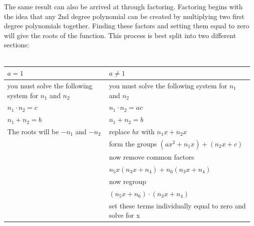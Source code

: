 \documentclass[../Math_Notes.tex]{subfiles}
\begin{document}
The same result can also be arrived at through factoring. Factoring begins with the idea that any 2nd degree polynomial can be created by multiplying two first degree polynomials together. Finding these factors and setting them equal to zero will give the roots of the function. This process is best split into two different sections: \\\\
\begin{tabularx}{\textwidth}{Y|Y}
  \(a=1\) & \(a\ne 1\) \\
  \hline you must solve the following system for $n_{1}$ and $n_{2}$ & you must solve the following system for $n_{1}$ and $n_{2}$\\
  \(n_{1}\cdot n_{2} = c\) & \(n_{1}\cdot n_{2} = ac\) \\ 
  \(n_{1}+n_{2}=b\) & \(n_{1}+n_{2}=b\) \\
  The roots will be $-n_{1}$ and $-n_{2}$ & replace $bx$ with $n_{1}x+ n_{2}x $ \\
                                          & form the groups $(ax^{2}+n_{1}x)+(n_{2}x+c)$\\
                                          & now remove common factors  \\
                                          & \(n_{5}x(n_{3}x+n_{4})+n_{6}(n_{3}x+n_{4})\)\\ 
                                          & now regroup \\
                                          & \((n_{5}x+n_{6})\cdot(n_{3}x+n_{4})\)\\
                                          & set these terms individually equal to zero and solve for x\\
\end{tabularx}\\
\end{document}
